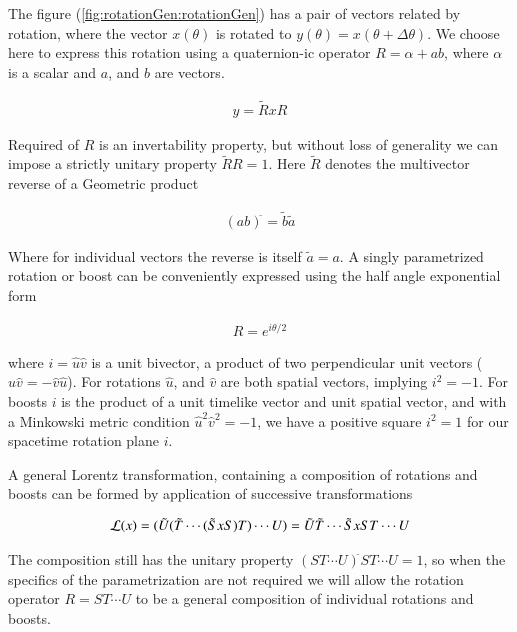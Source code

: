 The figure (\ref{fig:rotationGen:rotationGen}) has a pair of vectors related by rotation, where the vector $x(\theta)$ is rotated to $y(\theta) = x(\theta + \Delta\theta)$. We choose here to express this rotation using a quaternion-ic operator $R = \alpha + a b$, where $\alpha$ is a scalar and $a$, and $b$ are vectors.

\begin{align}\label{eqn:rotationGen:foo1}
y = \tilde{R} x R
\end{align}

Required of $R$ is an invertability property, but without loss of generality we can impose a strictly unitary property $\tilde{R} R = 1$.  Here $\tilde{R}$ denotes the multivector reverse of a Geometric product

\begin{align}\label{eqn:rotationGen:foo2}
(a b)^{\tilde{}} = \tilde{b} \tilde{a}
\end{align}

Where for individual vectors the reverse is itself $\tilde{a} = a$.  A singly parametrized rotation or boost can be conveniently expressed using the half angle exponential form

\begin{align}\label{eqn:rotationGen:foo3}
R = e^{i \theta/2} 
\end{align}

where $i = \hat{u}\hat{v}$ is a unit bivector, a product of two perpendicular unit vectors ($\hat{u} \hat{v} = - \hat{v} \hat{u}$).  For rotations $\hat{u}$, and $\hat{v}$ are both spatial vectors, implying $i^2 = -1$.  For boosts $i$ is the product of a unit timelike vector and unit spatial vector, and with a Minkowski metric condition $\hat{u}^2 \hat{v}^2 = -1$, we have a positive square $i^2 = 1$ for our spacetime rotation plane $i$.

A general Lorentz transformation, containing a composition of rotations and boosts can be formed by application of successive transformations 

\begin{align}\label{eqn:rotationGen:foo4}
\mathcal{L}(x) = (\tilde{U} (\tilde{T} \cdots (\tilde{S} x S) T )\cdots U) = \tilde{U} \tilde{T} \cdots \tilde{S} x S T \cdots U
\end{align}

The composition still has the unitary property $(S T \cdots U)^{\tilde{}} S T \cdots U = 1$, so when the specifics of the parametrization are not required we will allow the rotation operator $R = S T \cdots U$ to be a general composition of individual rotations and boosts.

